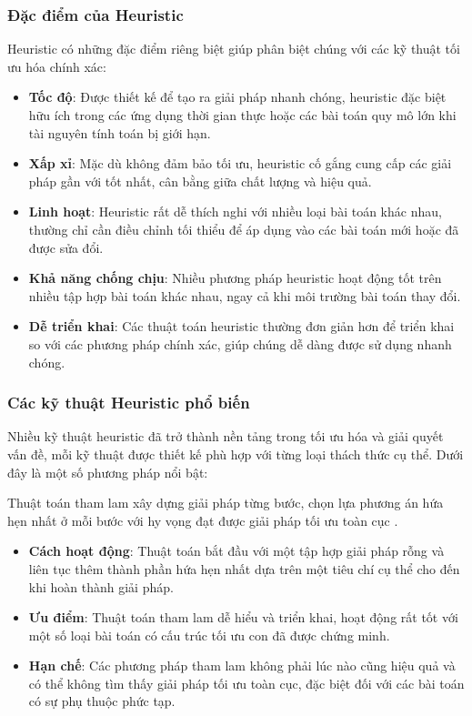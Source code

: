 \subsubsection{Đặc điểm của Heuristic}

\hspace{0.5cm}Heuristic có những đặc điểm riêng biệt giúp phân biệt chúng với các kỹ thuật tối ưu hóa chính xác:
\begin{itemize}
    \item \textbf{Tốc độ}: Được thiết kế để tạo ra giải pháp nhanh chóng, heuristic đặc biệt hữu ích trong các ứng dụng thời gian thực hoặc các bài toán quy mô lớn khi tài nguyên tính toán bị giới hạn.
    \item \textbf{Xấp xỉ}: Mặc dù không đảm bảo tối ưu, heuristic cố gắng cung cấp các giải pháp gần với tốt nhất, cân bằng giữa chất lượng và hiệu quả.
    \item \textbf{Linh hoạt}: Heuristic rất dễ thích nghi với nhiều loại bài toán khác nhau, thường chỉ cần điều chỉnh tối thiểu để áp dụng vào các bài toán mới hoặc đã được sửa đổi.
    \item \textbf{Khả năng chống chịu}: Nhiều phương pháp heuristic hoạt động tốt trên nhiều tập hợp bài toán khác nhau, ngay cả khi môi trường bài toán thay đổi.
    \item \textbf{Dễ triển khai}: Các thuật toán heuristic thường đơn giản hơn để triển khai so với các phương pháp chính xác, giúp chúng dễ dàng được sử dụng nhanh chóng.
\end{itemize}

\subsubsection{Các kỹ thuật Heuristic phổ biến}

\hspace{0.5cm}Nhiều kỹ thuật heuristic đã trở thành nền tảng trong tối ưu hóa và giải quyết vấn đề, mỗi kỹ thuật được thiết kế phù hợp với từng loại thách thức cụ thể. Dưới đây là một số phương pháp nổi bật:

\hspace{0.5cm}Thuật toán tham lam xây dựng giải pháp từng bước, chọn lựa phương án hứa hẹn nhất ở mỗi bước với hy vọng đạt được giải pháp tối ưu toàn cục \cite{silver2002heuristic}.

\begin{itemize}
    \item \textbf{Cách hoạt động}: Thuật toán bắt đầu với một tập hợp giải pháp rỗng và liên tục thêm thành phần hứa hẹn nhất dựa trên một tiêu chí cụ thể cho đến khi hoàn thành giải pháp.
    \item \textbf{Ưu điểm}: Thuật toán tham lam dễ hiểu và triển khai, hoạt động rất tốt với một số loại bài toán có cấu trúc tối ưu con đã được chứng minh.
    \item \textbf{Hạn chế}: Các phương pháp tham lam không phải lúc nào cũng hiệu quả và có thể không tìm thấy giải pháp tối ưu toàn cục, đặc biệt đối với các bài toán có sự phụ thuộc phức tạp.
\end{itemize}

